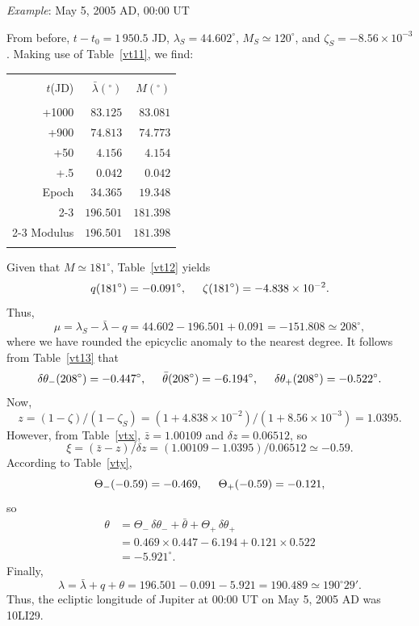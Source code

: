 \begin{center}
{\em Example}: May 5,  2005 AD, 00:00 UT
\end{center}
From before, $t-t_0=1\,950.5$ JD, $\lambda_S= 44.602^\circ$, $M_S\simeq 120^\circ$, and $\zeta_S= -8.56\times 10^{-3}$. Making use of
Table~\ref{vt11}, we find:
\begin{center}
\begin{tabular}{rrr}
&&\\
$t$(JD) & $ \bar{\lambda}(^\circ)$ & $M(^\circ)$\\[-2ex]
&&\\
+1000 & $83.125$ & $83.081$\\
+900 & $74.813$ & $74.773$\\
+50 & $4.156$ & $4.154$\\
+.5 & $0.042$ & $0.042$\\
Epoch & $34.365$ & $19.348$\\\cline{2-3}
&$196.501$ & $181.398$\\\cline{2-3}
Modulus & $196.501$ & $181.398$\\ 
&&\\
\end{tabular}
\end{center}
Given that $M\simeq 181^\circ$, Table~\ref{vt12} yields 
$$
q(181^\circ)= -0.091^\circ,\mbox{\hspace{0.5cm}}\zeta(181^\circ)=-4.838\times 10^{-2}.
$$
Thus, 
$$
\mu=\lambda_S - \bar{\lambda}-q = 44.602-196.501 + 0.091= -151.808\simeq
208^\circ,
$$
where we have rounded the epicyclic anomaly to the nearest degree. It follows from Table~\ref{vt13}
that 
$$
\delta\theta_-(208^\circ) = -0.447^\circ,\mbox{\hspace{0.5cm}}\bar{\theta}(208^\circ)=-6.194^\circ, \mbox{\hspace{0.5cm}}\delta\theta_+(208^\circ) = -0.522^\circ.
$$
Now,
$$ 
z= (1-\zeta)/(1-\zeta_S) = (1+4.838\times 10^{-2})/(1+8.56\times 10^{-3}) =
1.0395.
$$
However, from Table~\ref{vtx}, $\bar{z}= 1.00109$ and $\delta z = 0.06512$,
so
$$
\xi = (\bar{z}-z)/\delta z = (1.00109-1.0395)/0.06512 \simeq -0.59.
$$
According to Table~\ref{vty}, 
$$
\Theta_-(-0.59) = -0.469, \mbox{\hspace{0.5cm}}\Theta_+(-0.59) = -0.121,
$$
so
\begin{align*}
\theta  &= \Theta_-\,\delta\theta_- + \bar{\theta}+\Theta_+\,\delta\theta_+ \\[0.5ex]
&= 0.469\times 0.447-6.194+0.121\times 0.522\\[0.5ex]
& =- 5.921^\circ.
\end{align*}
Finally,
$$
\lambda=\bar{\lambda} + q + \theta= 196.501-0.091-5.921=190.489 \simeq 190^\circ 29'.
$$
Thus,
the ecliptic longitude of Jupiter at 00:00 UT on May 5, 2005 AD was 10LI29.

